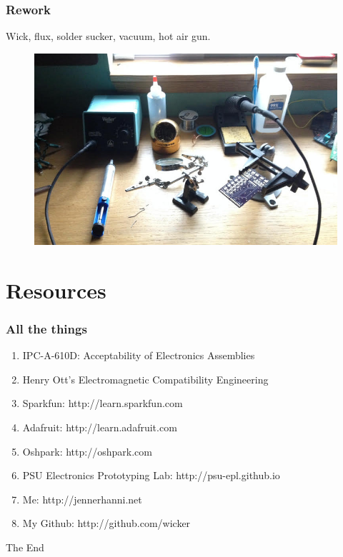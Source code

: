 \documentclass{beamer}
\begin{document}

\begin{frame}
\frametitle{Rework}
Wick, flux, solder sucker, vacuum, hot air gun. 
\begin{figure}
\includegraphics[width=0.8\linewidth]{rework.jpg}
\end{figure}
\end{frame}

\section{Resources} 
\begin{frame}
\frametitle{All the things}
\begin{enumerate}
\item{IPC-A-610D: Acceptability of Electronics Assemblies}
\item{Henry Ott's Electromagnetic Compatibility Engineering}
\newline
\item{Sparkfun: http://learn.sparkfun.com}
\item{Adafruit: http://learn.adafruit.com}
\item{Oshpark: http://oshpark.com}
\item{PSU Electronics Prototyping Lab: http://psu-epl.github.io}
\newline
\item{Me: http://jennerhanni.net}
\item{My Github: http://github.com/wicker}
\end{enumerate}
\end{frame}

\begin{frame}
\Huge{\centerline{The End}}
\end{frame}

\end{document}
